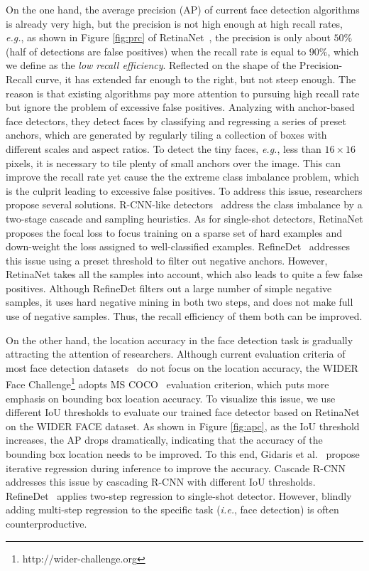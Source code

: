 \documentclass[letterpaper]{article} \usepackage{aaai19m}  \usepackage{times}  \usepackage{helvet}  \usepackage{courier}  \usepackage{url}  \usepackage{graphicx}  \usepackage{subfigure}
\def\ie{{\em i.e.}}
\def\eg{{\em e.g.}}
\begin{document}
On the one hand, the average precision (AP) of current face detection algorithms is already very high, but the precision is not high enough at high recall rates, \eg, as shown in Figure \ref{fig:prc} of RetinaNet~\cite{DBLP:conf/iccv/LinPRK17}, the precision is only about $50\%$ (half of detections are false positives) when the recall rate is equal to $90\%$, which we define as the \emph{low recall efficiency}. Reflected on the shape of the Precision-Recall curve, it has extended far enough to the right, but not steep enough. The reason is that existing algorithms pay more attention to pursuing high recall rate but ignore the problem of excessive false positives. Analyzing with anchor-based face detectors, they detect faces by classifying and regressing a series of preset anchors, which are generated by regularly tiling a collection of boxes with different scales and aspect ratios. To detect the tiny faces, \eg, less than $16\times16$ pixels, it is necessary to tile plenty of small anchors over the image. This can improve the recall rate yet cause the the extreme class imbalance problem, which is the culprit leading to excessive false positives. To address this issue, researchers propose several solutions. R-CNN-like detectors~\cite{DBLP:conf/iccv/Girshick15,DBLP:journals/pami/RenHG017} address the class imbalance by a two-stage cascade and sampling heuristics. As for single-shot detectors, RetinaNet proposes the focal loss to focus training on a sparse set of hard examples and down-weight the loss assigned to well-classified examples. RefineDet~\cite{DBLP:journals/corr/abs-1711-06897} addresses this issue using a preset threshold to filter out negative anchors. However, RetinaNet takes all the samples into account, which also leads to quite a few false positives. Although RefineDet filters out a large number of simple negative samples, it uses hard negative mining in both two steps, and does not make full use of negative samples. Thus, the recall efficiency of them both can be improved.

On the other hand, the location accuracy in the face detection task is gradually attracting the attention of researchers. Although current evaluation criteria of most face detection datasets~\cite{fddbTech,DBLP:conf/cvpr/YangLLT16} do not focus on the location accuracy, the WIDER Face Challenge\footnote{http://wider-challenge.org} adopts MS COCO~\cite{DBLP:conf/eccv/LinMBHPRDZ14} evaluation criterion, which puts more emphasis on bounding box location accuracy. To visualize this issue, we use different IoU thresholds to evaluate our trained face detector based on RetinaNet on the WIDER FACE dataset. As shown in Figure \ref{fig:apc}, as the IoU threshold increases, the AP drops dramatically, indicating that the accuracy of the bounding box location needs to be improved. To this end, Gidaris et al.~\cite{DBLP:conf/iccv/GidarisK15} propose iterative regression during inference to improve the accuracy. Cascade R-CNN~\cite{DBLP:journals/corr/abs-1712-00726} addresses this issue by cascading R-CNN with different IoU thresholds. RefineDet~\cite{DBLP:journals/corr/abs-1711-06897} applies two-step regression to single-shot detector. However, blindly adding multi-step regression to the specific task (\ie, face detection) is often counterproductive.
\end{document}
